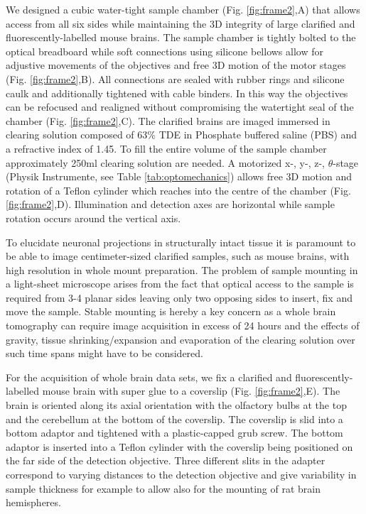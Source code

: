 \documentclass[12pt]{spieman}  %
\begin{document}
We designed a cubic water-tight sample chamber (Fig. \ref{fig:frame2},A) that allows access from all six sides while maintaining the 3D integrity of large clarified and fluorescently-labelled mouse brains. The sample chamber is tightly bolted  to the optical breadboard while soft connections using silicone bellows allow for adjustive movements of the objectives and free 3D motion of the motor stages (Fig. \ref{fig:frame2},B). All connections are sealed with rubber rings and silicone caulk and additionally tightened with cable binders. In this way the objectives can be refocused and realigned without compromising the watertight seal of the chamber (Fig. \ref{fig:frame2},C). The clarified brains are imaged immersed in clearing solution composed of 63\% TDE in Phosphate buffered saline (PBS) and a refractive index of 1.45. To fill the entire volume of the sample chamber approximately 250ml clearing solution are needed. A motorized x-, y-, z-, $\theta$-stage (Physik Instrumente, see Table \ref{tab:optomechanics}) allows free 3D motion and rotation of a Teflon cylinder which reaches into the centre of the chamber (Fig. \ref{fig:frame2},D). Illumination and detection axes are horizontal while sample rotation occurs around the vertical axis.		
		
To elucidate neuronal projections in structurally intact tissue it is paramount to be able to image centimeter-sized clarified samples, such as mouse brains, with high resolution in whole mount preparation. %
The problem of sample mounting in a light-sheet microscope arises from the fact that optical access to the sample is required from 3-4 planar sides leaving only two opposing sides to insert, fix and move the sample. %
Stable mounting is hereby a key concern as a whole brain tomography can require image acquisition in excess of 24 hours and the effects of gravity, tissue shrinking/expansion and evaporation of the clearing solution over such time spans might have to be considered. 

For the acquisition of whole brain data sets, we fix a clarified and fluorescently-labelled mouse brain with super glue to a coverslip (Fig. \ref{fig:frame2},E). The brain is oriented along its axial orientation with the olfactory bulbs at the top and the cerebellum at the bottom of the coverslip. The coverslip is slid into a bottom adaptor and tightened with a plastic-capped grub screw. The bottom adaptor is inserted into a Teflon cylinder with the coverslip being positioned on the far side of the detection objective. Three different slits in the adapter correspond to varying distances to the detection objective and give variability in sample thickness for example to allow also for the mounting of rat brain hemispheres.
	
\end{document}
